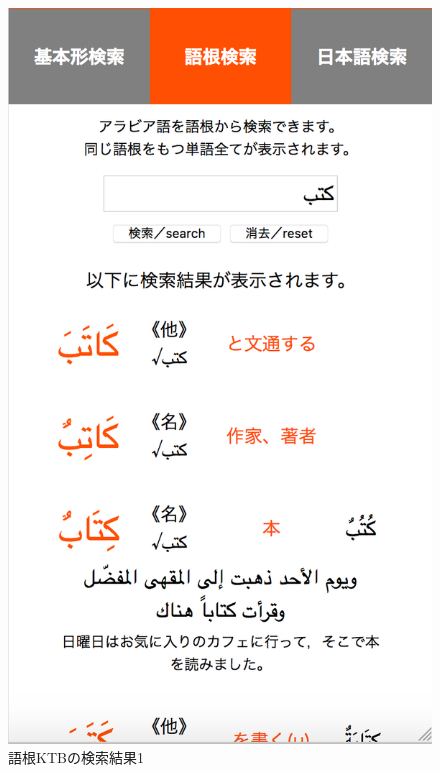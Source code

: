 \documentclass[technicalreport]{ieicej}
\begin{document}
\begin{figure}[H]
 \begin{minipage}{0.5\hsize}
  \begin{center}
   \includegraphics[scale=0.3]{fig03.png}
  \end{center}
  \caption{語根KTBの検索結果1}
 \end{minipage}
 \begin{minipage}{0.5\hsize}
  \begin{center}

\end{center}
\end{minipage}
\end{figure}
\end{document}
